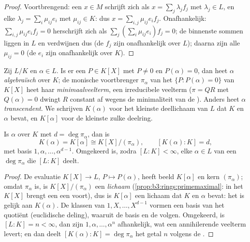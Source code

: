 \begin{proof}
Voortbrengend: een $x \in M$ schrijft zich als $x = \sum_j
\lambda_jf_j$ met $\lambda_j \in L$, en elke $\lambda_j = \sum_i
\mu_{ij}e_i$ met $\mu_{ij} \in K$: dus $x =
\sum_{i,j}\mu_{ij}e_if_j$. Onafhankelijk: $\sum_{i,j}\mu_{ij}
e_if_j = 0$ herschrijft zich als $\sum_j (\sum_i \mu_{ij}e_i)f_j =
0$; de binnenste sommen liggen in $L$ en verdwijnen dus (de $f_j$
zijn onafhankelijk over $L$); daarna zijn alle $\mu_{ij} = 0$ (de
$e_i$ zijn onafhankelijk over $K$).
\end{proof}

\begin{definition}\label{def:b3:galois:algebraic}
Zij $L/K$ en $\alpha \in L$. Is er een $P \in K[X]$ met $P \neq 0$
en $P(\alpha) = 0$, dan heet $\alpha$
\emph{algebraïsch} over $K$; de
monische voortbrenger $\pi_\alpha$ van het  $\{P :
P(\alpha) = 0\}$ van $K[X]$ heet haar
\emph{minimaalveelterm}, een irreducibele veelterm ($\pi = QR$ met
$Q(\alpha) = 0$ dwingt $R$ constant af wegens de minimaliteit van
de ). Anders heet $\alpha$ \emph{transcendent}. We schrijven
$K(\alpha)$ voor het kleinste deellichaam van $L$ dat $K$ en
$\alpha$ bevat, en $K[\alpha]$ voor de kleinste zulke deelring.
\end{definition}

\begin{theorem}\label{thm:b3:galois:simple}
Is $\alpha$  over $K$ met $d = \deg\pi_\alpha$, dan is
\[
K(\alpha) = K[\alpha] \cong K[X]/(\pi_\alpha),
\qquad [K(\alpha) : K] = d,
\]
met basis $1, \alpha, \dots, \alpha^{d-1}$. Omgekeerd is, zodra
$[L:K] < \infty$, elke $\alpha \in L$  van een 
$\deg \pi_\alpha$ die $[L:K]$ deelt.
\end{theorem}

\begin{proof}
De evaluatie $K[X] \to L$, $P \mapsto P(\alpha)$, heeft beeld
$K[\alpha]$ en kern $(\pi_\alpha)$; omdat $\pi_\alpha$
 is, is $K[X]/(\pi_\alpha)$ een \emph{lichaam}
(\cref{prop:b3:rings:primemaximal}: in het 
$K[X]$ brengt een  een  voort),
dus is $K[\alpha]$ een lichaam dat $K$ en $\alpha$ bevat: het is
gelijk aan $K(\alpha)$. De klassen van $1, X, \dots, X^{d-1}$
vormen een basis van het quotiënt (euclidische deling), waaruit de
basis en de  volgen. Omgekeerd, is $[L:K] = n < \infty$, dan
zijn $1, \alpha, \dots, \alpha^n$ afhankelijk, wat een
annihilerende veelterm levert; en dan deelt $[K(\alpha):K] =
\deg\pi_\alpha$ het getal $n$ volgens de .
\end{proof}

